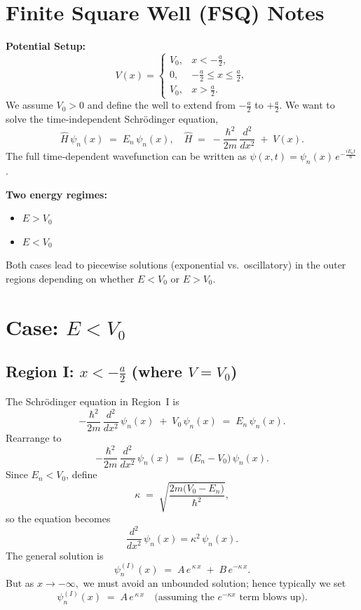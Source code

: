 
\section*{Finite Square Well (FSQ) Notes}

\noindent
\textbf{Potential Setup:}
\[
V(x) = 
\begin{cases}
V_0, & x < -\frac{a}{2},\\[6pt]
0,    & -\frac{a}{2} \le x \le \frac{a}{2},\\[6pt]
V_0, & x > \frac{a}{2}.
\end{cases}
\]
We assume $V_0 > 0$ and define the well to extend from $-\tfrac{a}{2}$ to $+\tfrac{a}{2}$. We want to solve the time‐independent Schr\"odinger equation,
\[
\hat{H}\,\psi_n(x) \;=\; E_n\,\psi_n(x), 
\quad
\hat{H} \;=\; -\frac{\hbar^2}{2m}\,\frac{d^2}{dx^2} \;+\; V(x).
\]
The full time‐dependent wavefunction can be written as $\psi(x,t) = \psi_n(x)\,e^{-\tfrac{i E_n t}{\hbar}}$.

\medskip
\noindent
\textbf{Two energy regimes:}
\begin{itemize}
\item $E > V_0$
\item $E < V_0$
\end{itemize}
Both cases lead to piecewise solutions (exponential vs.\ oscillatory) in the outer regions depending on whether $E < V_0$ or $E > V_0$.

\section*{Case: $E < V_0$}
\subsection*{Region I: $x < -\frac{a}{2}$ (where $V=V_0$)}
The Schr\"odinger equation in Region~I is
\[
-\frac{\hbar^2}{2m}\,\frac{d^2}{dx^2}\,\psi_n(x) \;+\; V_0\,\psi_n(x)
\;=\;
E_n\,\psi_n(x).
\]
Rearrange to
\[
-\frac{\hbar^2}{2m}\,\frac{d^2}{dx^2}\,\psi_n(x)
\;=\;
\bigl(E_n - V_0\bigr)\,\psi_n(x).
\]
Since $E_n < V_0$, define
\[
\kappa \;=\; \sqrt{\frac{2m\bigl(V_0 - E_n\bigr)}{\hbar^2}},
\]
so the equation becomes
\[
\frac{d^2}{dx^2}\,\psi_n(x) = \kappa^2\,\psi_n(x).
\]
The general solution is
\[
\psi_n^{(I)}(x) \;=\; A\,e^{\,\kappa\,x} \;+\; B\,e^{-\kappa\,x}.
\]
But as $x\to -\infty,$ we must avoid an unbounded solution; hence typically we set
\[
\psi_n^{(I)}(x) \;=\; A\,e^{\,\kappa\,x} \quad\text{(assuming the $e^{-\kappa x}$ term blows up).}
\]

